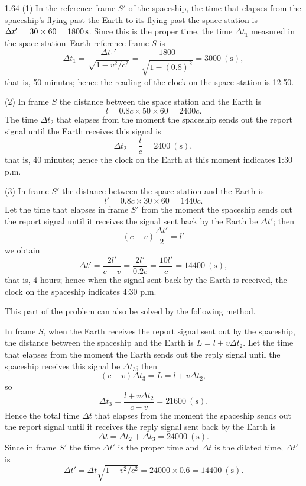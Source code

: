 \begin{solution}{1.64}
(1) In the reference frame $S'$ of the spaceship, the time that elapses from the spaceship's flying past the Earth to its flying past the space station is $\Delta t_1'=30\times60=1800\,\mathrm{s}$. Since this is the proper time, the time $\Delta t_1$ measured in the space-station--Earth reference frame $S$ is
\[
\Delta t_1=\frac{\Delta t_1'}{\sqrt{1-v^2/c^2}}=\frac{1800}{\sqrt{1-(0.8)^2}}=3000\ (\mathrm{s}),
\]
that is, 50 minutes; hence the reading of the clock on the space station is 12:50.

(2) In frame $S$ the distance between the space station and the Earth is
\[
l=0.8c\times50\times60=2400c .
\]
The time $\Delta t_2$ that elapses from the moment the spaceship sends out the report signal until the Earth receives this signal is
\[
\Delta t_2=\frac{l}{c}=2400\ (\mathrm{s}),
\]
that is, 40 minutes; hence the clock on the Earth at this moment indicates 1:30 p.m.

(3) In frame $S'$ the distance between the space station and the Earth is
\[
l'=0.8c\times30\times60=1440c .
\]
Let the time that elapses in frame $S'$ from the moment the spaceship sends out the report signal until it receives the signal sent back by the Earth be $\Delta t'$; then
\[
(c-v)\frac{\Delta t'}{2}=l'
\]
we obtain
\[
\Delta t'=\frac{2l'}{c-v}=\frac{2l'}{0.2c}=\frac{10l'}{c}=14400\ (\mathrm{s}),
\]
that is, 4 hours; hence when the signal sent back by the Earth is received, the clock on the spaceship indicates 4:30 p.m.

This part of the problem can also be solved by the following method.

In frame $S$, when the Earth receives the report signal sent out by the spaceship, the distance between the spaceship and the Earth is $L=l+v\Delta t_2$. Let the time that elapses from the moment the Earth sends out the reply signal until the spaceship receives this signal be $\Delta t_3$; then
\[
(c-v)\Delta t_3=L=l+v\Delta t_2 ,
\]
so
\[
\Delta t_3=\frac{l+v\Delta t_2}{c-v}=21600\ (\mathrm{s}).
\]
Hence the total time $\Delta t$ that elapses from the moment the spaceship sends out the report signal until it receives the reply signal sent back by the Earth is
\[
\Delta t=\Delta t_2+\Delta t_3=24000\ (\mathrm{s}).
\]
Since in frame $S'$ the time $\Delta t'$ is the proper time and $\Delta t$ is the dilated time, $\Delta t'$ is
\[
\Delta t'=\Delta t\sqrt{1-v^2/c^2}=24000\times0.6=14400\ (\mathrm{s}).
\]
\end{solution}

